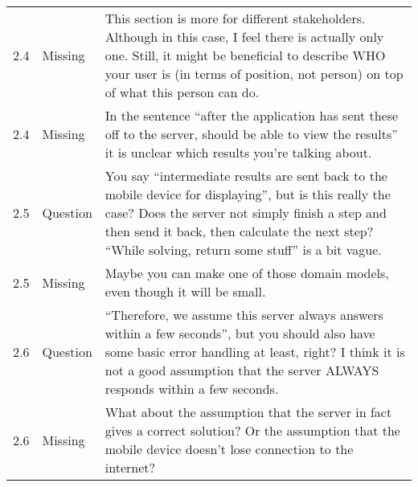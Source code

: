 \begin{longtable}{l|l|p{}}
2.4 & Missing & This section is more for different stakeholders. Although in this case, I feel there is actually only one. Still, it might be beneficial to describe WHO your user is (in terms of position, not person) on top of what this person can do. \\
2.4 & Missing & In the sentence ``after the application has sent these off to the server, should be able to view the results'' it is unclear which results you're talking about. \\
2.5 & Question & You say ``intermediate results are sent back to the mobile device for displaying'', but is this really the case? Does the server not simply finish a step and then send it back, then calculate the next step? ``While solving, return some stuff'' is a bit vague. \\
2.5 & Missing & Maybe you can make one of those domain models, even though it will be small. \\
2.6 & Question & ``Therefore, we assume this server always answers within a few seconds'', but you should also have some basic error handling at least, right? I think it is not a good assumption that the server ALWAYS responds within a few seconds.  \\
2.6 & Missing & What about the assumption that the server in fact gives a correct solution? Or the assumption that the mobile device doesn't lose connection to the internet? \\
\end{longtable}

